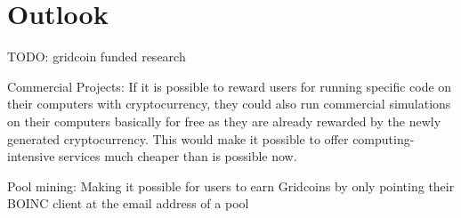 \section{Outlook}

TODO: gridcoin funded research

Commercial Projects: If it is possible to reward users for running specific code on their computers with cryptocurrency, they could also run commercial simulations on their computers basically for free as they are already rewarded by the newly generated cryptocurrency. This would make it possible to offer computing-intensive services much cheaper than is possible now.

Pool mining: Making it possible for users to earn Gridcoins by only pointing their BOINC client at the email address of a pool

